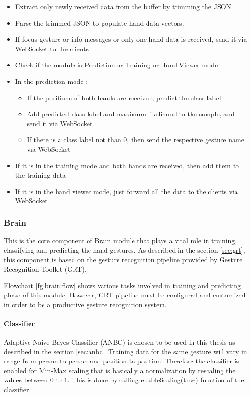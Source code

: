 \begin{itemize}
	\item Extract only newly received data from the buffer by trimming the JSON
	\item Parse the trimmed JSON to populate hand data vectors. 
	\item If focus gesture or info messages or only one hand data is received, send it via WebSocket to the clients
	\item Check if the module is Prediction or Training or Hand Viewer mode
	\item In the prediction mode :
		\begin{itemize}
		\item If the positions of both hands are received, predict the class label
		\item Add predicted class label and maximum likelihood to the sample, and send it via WebSocket
		\item If there is a class label not than 0, then send the respective gesture name via WebSocket
		\end{itemize}
	\item If it is in the training mode and both hands are received, then add them to the training data
	\item If it is in the hand viewer mode, just forward all the data to the clients via WebSocket
\end{itemize} 

\subsubsection{Brain}
This is the core component of Brain module that plays a vital role in training, classifying and predicting the hand gestures. As described in the section \ref{sec:grt}, this component is based on the gesture recognition pipeline provided by Gesture Recognition Toolkit (GRT).

Flowchart \ref{fg:brain:flow} shows various tasks involved in training and predicting phase of this module. However, GRT pipeline must be configured and customized in order to be a productive gesture recognition system.

\paragraph*{Classifier} Adaptive Naive Bayes Classifier (ANBC) is chosen to be used in this thesis as described in the section \ref{sec:anbc}. Training data for the same gesture will vary in range from person to person and position to position. Therefore the classifier is enabled for Min-Max scaling that is basically a normalization by rescaling the values between 0 to 1.  This is done by calling enableScaling(true) function of the classifier.

